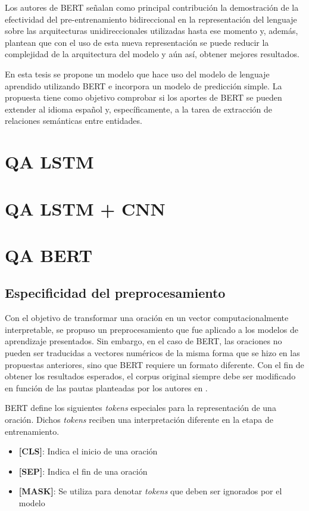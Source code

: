 Los autores de BERT señalan como principal contribución la demostración de la efectividad del pre-entrenamiento bidireccional en la representación del lenguaje sobre las arquitecturas unidireccionales utilizadas hasta ese momento y, además, plantean que con el uso de esta nueva representación se puede reducir la complejidad de la arquitectura del modelo y aún así, obtener mejores resultados.

En esta tesis se propone un modelo que hace uso del modelo de lenguaje aprendido utilizando BERT e incorpora un modelo de predicción simple. La propuesta tiene como objetivo comprobar si los aportes de BERT se pueden extender al idioma español y, específicamente, a la tarea de extracción de relaciones semánticas entre entidades.

\section{QA LSTM}

\section{QA LSTM + CNN}

\section{QA BERT}

\subsection{Especificidad del preprocesamiento}

Con el objetivo de transformar una oración en un vector computacionalmente interpretable, se propuso un preprocesamiento que fue aplicado a los modelos de aprendizaje presentados. Sin embargo, en el caso de BERT, las oraciones no pueden ser traducidas a vectores numéricos de la misma forma que se hizo en las propuestas anteriores, sino que BERT requiere un formato diferente. Con el fin de obtener los resultados esperados, el corpus original siempre debe ser modificado en función de las pautas planteadas por los autores en \cite{2018-devlin-bert}.

BERT define los siguientes \textit{tokens} especiales para la representación de una oración. Dichos \textit{tokens} reciben una interpretación diferente en la etapa de entrenamiento.
\begin{itemize}
  \item \textbf{[CLS]}: Indica el inicio de una oración
  \item \textbf{[SEP]}: Indica el fin de una oración
  \item \textbf{[MASK]}: Se utiliza para denotar \textit{tokens} que deben ser ignorados por el modelo
\end{itemize}

